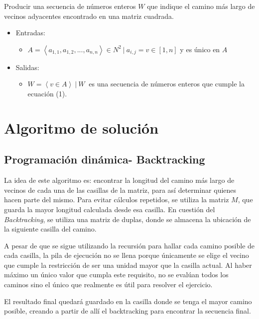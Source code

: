 \documentclass[letter]{article}
\begin{document}
Producir una secuencia de números enteros $W$ que indique el camino más largo de vecinos adyacentes encontrado en una matriz cuadrada. 
\begin{itemize}
    \item Entradas:
    \begin{itemize}
        \item $A = \left< a_{1,1},a_{1,2}, ... , a_{n,n}\right> \in N^2 ~|~ a_{i,j} = v \in [1,n] $ y es único en $A$
    \end{itemize}
    \item Salidas:
    \begin{itemize}
        \item $W = \left< v \in A \right> ~ | ~ W ~ $ es una secuencia de números enteros que cumple la ecuación (1).
    \end{itemize}
\end{itemize}

\section{Algoritmo de solución} \label{algoritmos}

\newpage
\subsection{Programación dinámica- Backtracking}
\label{algoritmos:programaciondinamica}
La idea de este algoritmo es: encontrar la longitud del camino más largo de vecinos de cada una de las casillas de la matriz, para así determinar quienes hacen parte del mismo. Para evitar cálculos repetidos, se utiliza la matriz $M$, que guarda la mayor longitud calculada desde esa casilla. En cuestión del \textit{Backtracking}, se utiliza una matriz de duplas, donde se almacena la ubicación de la siguiente casilla del camino.

A pesar de que se sigue utilizando la recursión para hallar cada camino posible de cada casilla, la pila de ejecución no se llena porque únicamente se elige el vecino que cumple la restricción de ser una unidad mayor que la casilla actual. Al haber máximo un único valor que cumpla este requisito, no se evalúan todos los caminos sino el único que realmente es útil para resolver el ejercicio.

El resultado final quedará guardado en la casilla donde se tenga el mayor camino posible, creando a partir de allí el backtracking para encontrar la secuencia final.
\end{document}
